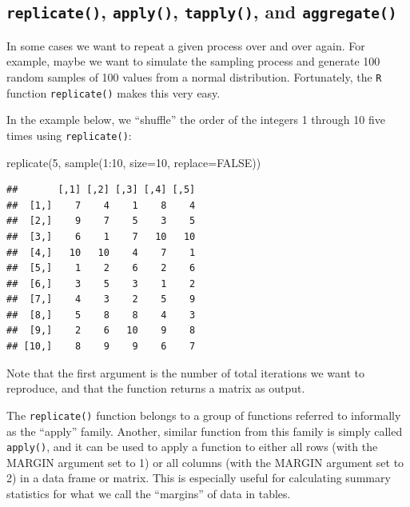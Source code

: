 \documentclass[
]{book}
\newenvironment{Shaded}{\begin{snugshade}}{\end{snugshade}}
\newcommand{\AttributeTok}[1]{\textcolor[rgb]{0.77,0.63,0.00}{#1}}
\newcommand{\ConstantTok}[1]{\textcolor[rgb]{0.00,0.00,0.00}{#1}}
\newcommand{\DecValTok}[1]{\textcolor[rgb]{0.00,0.00,0.81}{#1}}
\newcommand{\FunctionTok}[1]{\textcolor[rgb]{0.00,0.00,0.00}{#1}}
\newcommand{\NormalTok}[1]{#1}
\newcommand{\SpecialCharTok}[1]{\textcolor[rgb]{0.00,0.00,0.00}{#1}}
\begin{document}
\hypertarget{replicate-apply-tapply-and-aggregate}{%
\subsection{\texorpdfstring{\texttt{replicate()}, \texttt{apply()}, \texttt{tapply()}, and \texttt{aggregate()}}{replicate(), apply(), tapply(), and aggregate()}}\label{replicate-apply-tapply-and-aggregate}}

In some cases we want to repeat a given process over and over again. For example, maybe we want to simulate the sampling process and generate 100 random samples of 100 values from a normal distribution. Fortunately, the \texttt{R} function \texttt{replicate()} makes this very easy.

In the example below, we ``shuffle'' the order of the integers 1 through 10 five times using \texttt{replicate()}:

\begin{Shaded}
\begin{Highlighting}[]
\FunctionTok{replicate}\NormalTok{(}\DecValTok{5}\NormalTok{, }\FunctionTok{sample}\NormalTok{(}\DecValTok{1}\SpecialCharTok{:}\DecValTok{10}\NormalTok{, }\AttributeTok{size=}\DecValTok{10}\NormalTok{, }\AttributeTok{replace=}\ConstantTok{FALSE}\NormalTok{))}
\end{Highlighting}
\end{Shaded}

\begin{verbatim}
##       [,1] [,2] [,3] [,4] [,5]
##  [1,]    7    4    1    8    4
##  [2,]    9    7    5    3    5
##  [3,]    6    1    7   10   10
##  [4,]   10   10    4    7    1
##  [5,]    1    2    6    2    6
##  [6,]    3    5    3    1    2
##  [7,]    4    3    2    5    9
##  [8,]    5    8    8    4    3
##  [9,]    2    6   10    9    8
## [10,]    8    9    9    6    7
\end{verbatim}

Note that the first argument is the number of total iterations we want to reproduce, and that the function returns a matrix as output.

The \texttt{replicate()} function belongs to a group of functions referred to informally as the ``apply'' family. Another, similar function from this family is simply called \texttt{apply()}, and it can be used to apply a function to either all rows (with the MARGIN argument set to 1) or all columns (with the MARGIN argument set to 2) in a data frame or matrix. This is especially useful for calculating summary statistics for what we call the ``margins'' of data in tables.
\end{document}
